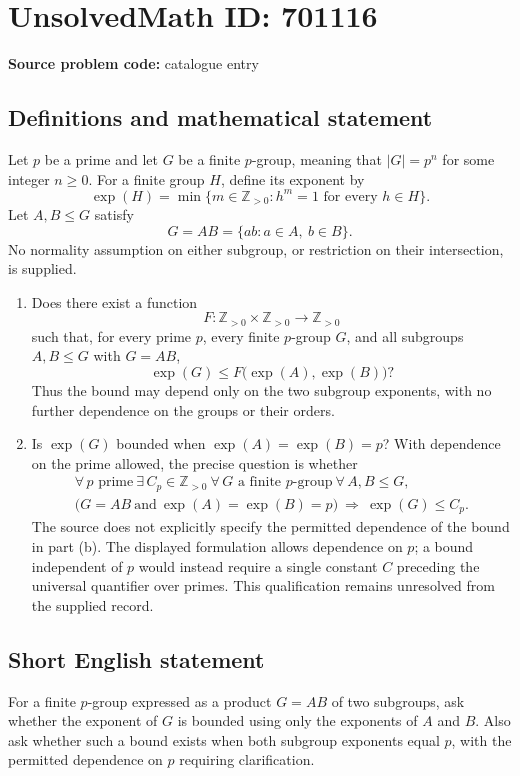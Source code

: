 \documentclass[11pt]{article}
\newcommand{\Z}{\mathbb{Z}}
\begin{document}
\section*{UnsolvedMath ID: 701116}
\textbf{Source problem code:} catalogue entry
\subsection{Definitions and mathematical statement}
Let \(p\) be a prime and let \(G\) be a finite \(p\)-group, meaning that \(|G|=p^n\) for some integer \(n\geq 0\). For a finite group \(H\), define its exponent by
\[
\exp(H)=\min\{m\in\Z_{>0}:h^m=1\text{ for every }h\in H\}.
\]
Let \(A,B\leq G\) satisfy
\[
G=AB=\{ab:a\in A,\ b\in B\}.
\]
No normality assumption on either subgroup, or restriction on their intersection, is supplied.

\begin{enumerate}
\item[(a)] Does there exist a function
\[
F:\Z_{>0}\times\Z_{>0}\longrightarrow\Z_{>0}
\]
such that, for every prime \(p\), every finite \(p\)-group \(G\), and all subgroups \(A,B\leq G\) with \(G=AB\),
\[
\exp(G)\leq F\bigl(\exp(A),\exp(B)\bigr)?
\]
Thus the bound may depend only on the two subgroup exponents, with no further dependence on the groups or their orders.
\item[(b)] Is \(\exp(G)\) bounded when \(\exp(A)=\exp(B)=p\)? With dependence on the prime allowed, the precise question is whether
\[
\begin{gathered}
\forall\,p\text{ prime}\ \exists\,C_p\in\Z_{>0}\ \forall\,G\text{ a finite }p\text{-group}\ \forall\,A,B\leq G,\\
\bigl(G=AB\ \text{and}\ \exp(A)=\exp(B)=p\bigr)
\ \Longrightarrow\ \exp(G)\leq C_p.
\end{gathered}
\]
The source does not explicitly specify the permitted dependence of the bound in part (b). The displayed formulation allows dependence on \(p\); a bound independent of \(p\) would instead require a single constant \(C\) preceding the universal quantifier over primes. This qualification remains unresolved from the supplied record.
\end{enumerate}
\subsection{Short English statement}
For a finite \(p\)-group expressed as a product \(G=AB\) of two subgroups, ask whether the exponent of \(G\) is bounded using only the exponents of \(A\) and \(B\). Also ask whether such a bound exists when both subgroup exponents equal \(p\), with the permitted dependence on \(p\) requiring clarification.
\end{document}

